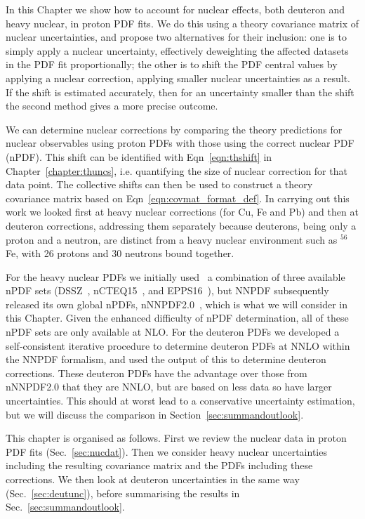 In this Chapter we show how to account for nuclear effects, both deuteron and heavy nuclear, in proton PDF fits. We do this using a theory covariance matrix of nuclear uncertainties, and propose two alternatives for their inclusion: one is to simply apply a nuclear uncertainty, effectively deweighting the affected datasets in the PDF fit proportionally; the other is to shift the PDF central values by applying a nuclear correction, applying smaller nuclear uncertainties as a result. If the shift is estimated accurately, then for an uncertainty smaller than the shift the second method gives a more precise outcome.

We can determine nuclear corrections by comparing the theory predictions for nuclear observables using proton PDFs with those using the correct nuclear PDF (nPDF). This shift can be identified with Eqn~\ref{eqn:thshift} in Chapter~\ref{chapter:thuncs}, i.e. quantifying the size of nuclear correction for that data point. The collective shifts can then be used to construct a theory covariance matrix based on Eqn~\ref{eqn:covmat_format_def}. In carrying out this work we looked first at heavy nuclear corrections (for Cu, Fe and Pb) and then at deuteron corrections, addressing them separately because deuterons, being only a proton and a neutron, are distinct from a heavy nuclear environment such as $^{56}$Fe, with 26 protons and 30 neutrons bound together. 

For the heavy nuclear PDFs we initially used~\cite{Ball:2018twp} a combination of three available nPDF sets (DSSZ~\cite{deFlorian:2011fp},
nCTEQ15~\cite{Kovarik:2015cma}, and EPPS16~\cite{Eskola:2016oht}), but NNPDF subsequently released its own global nPDFs, nNNPDF2.0~\cite{AbdulKhalek:2020yuc}, which is what we will consider in this Chapter. Given the enhanced difficulty of nPDF determination, all of these nPDF sets are only available at NLO. For the deuteron PDFs we developed a self-consistent iterative procedure to determine deuteron PDFs at NNLO within the NNPDF formalism, and used the output of this to determine deuteron corrections. These deuteron PDFs have the advantage over those from nNNPDF2.0 that they are NNLO, but are based on less data so have larger uncertainties. This should at worst lead to a conservative uncertainty estimation, but we will discuss the comparison in Section~\ref{sec:summandoutlook}.

This chapter is organised as follows. First we review the nuclear data in proton PDF fits (Sec.~\ref{sec:nucdat}). Then we consider heavy nuclear uncertainties including the resulting covariance matrix and the PDFs including these corrections. We then look at deuteron uncertainties in the same way (Sec.~\ref{sec:deutunc}), before summarising the results in Sec.~\ref{sec:summandoutlook}.

